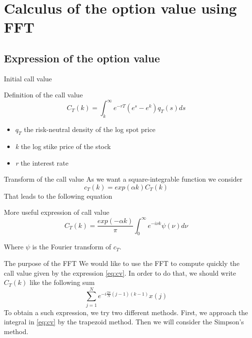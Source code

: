 \documentclass{beamer}
\begin{document}
\section{Calculus of the option value using FFT}

\subsection{Expression of the option value}

\begin{frame}{Initial call value}
\begin{block}{Definition of the call value}
\begin{equation}
C_{T}(k)=\int_{k}^{\infty}e^{-rT}(e^{s}-e^{k})q_{T}(s)ds
\end{equation}
\end{block}
\begin{itemize}
\item $q_{T}$ the risk-neutral density of the log spot price
\item \emph{k} the log stike price of the stock
\item \emph{r} the interest rate
\end{itemize}
\end{frame}

\begin{frame}{Transform of the call value}
As we want a square-integrable function we consider
\begin{equation*}
c_{T}(k)=exp(\alpha k)C_{T}(k)
\end{equation*}
That leads to the following equation
\begin{block}{More useful expression of call value}
\begin{equation}
C_{T}(k)=\frac{exp(-\alpha k)}{\pi}\int_{0}^{\infty}e^{-i \nu k}\psi(\nu)d\nu
\label{eq:cv}
\end{equation}
\end{block}
Where $\psi$ is the Fourier transform of $c_{T}$.
\end{frame}

\begin{frame}{The purpose of the FFT}
We would like to use the FFT to compute quickly the call value given by the expression \eqref{eq:cv}. In order to do that, we should write $C_{T}(k)$ like the following sum
\begin{equation*}
\sum_{j=1}^{N}e^{-i\frac{2\pi}{N}(j-1)(k-1)}x(j)
\end{equation*}
To obtain a such expression, we try two different methods. First, we approach the integral in \eqref{eq:cv} by the trapezoid method. Then we will consider the Simpson's method.
\end{frame}
\end{document}
